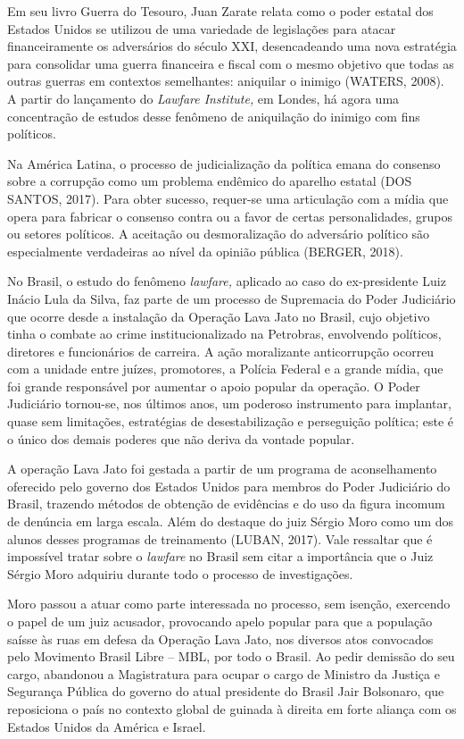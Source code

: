 Em seu livro Guerra do Tesouro, Juan Zarate relata como o poder estatal
dos Estados Unidos se utilizou de uma variedade de legislações para
atacar financeiramente os adversários do século XXI, desencadeando uma
nova estratégia para consolidar uma guerra financeira e fiscal com o
mesmo objetivo que todas as outras guerras em contextos semelhantes:
aniquilar o inimigo (WATERS, 2008). A partir do lançamento do
\emph{Lawfare Institute,} em Londes, há agora uma concentração de
estudos desse fenômeno de aniquilação do inimigo com fins políticos.

Na América Latina, o processo de judicialização da política emana do
consenso sobre a corrupção como um problema endêmico do aparelho estatal
(DOS SANTOS, 2017). Para obter sucesso, requer-se uma articulação com a
mídia que opera para fabricar o consenso contra ou a favor de certas
personalidades, grupos ou setores políticos. A aceitação ou
desmoralização do adversário político são especialmente verdadeiras ao
nível da opinião pública (BERGER, 2018).

No Brasil, o estudo do fenômeno \emph{lawfare,} aplicado ao caso do
ex-presidente Luiz Inácio Lula da Silva, faz parte de um processo de
Supremacia do Poder Judiciário que ocorre desde a instalação da Operação
Lava Jato no Brasil, cujo objetivo tinha o combate ao crime
institucionalizado na Petrobras, envolvendo políticos, diretores e
funcionários de carreira. A ação moralizante anticorrupção ocorreu com a
unidade entre juízes, promotores, a Polícia Federal e a grande mídia,
que foi grande responsável por aumentar o apoio popular da operação. O
Poder Judiciário tornou-se, nos últimos anos, um poderoso instrumento
para implantar, quase sem limitações, estratégias de desestabilização e
perseguição política; este é o único dos demais poderes que não deriva
da vontade popular.

A operação Lava Jato foi gestada a partir de um programa de
aconselhamento oferecido pelo governo dos Estados Unidos para membros do
Poder Judiciário do Brasil, trazendo métodos de obtenção de evidências e
do uso da figura incomum de denúncia em larga escala. Além do destaque
do juiz Sérgio Moro como um dos alunos desses programas de treinamento
(LUBAN, 2017). Vale ressaltar que é impossível tratar sobre o
\emph{lawfare} no Brasil sem citar a importância que o Juiz Sérgio Moro
adquiriu durante todo o processo de investigações.

Moro passou a atuar como parte interessada no processo, sem isenção,
exercendo o papel de um juiz acusador, provocando apelo popular para que
a população saísse às ruas em defesa da Operação Lava Jato, nos diversos
atos convocados pelo Movimento Brasil Libre -- MBL, por todo o Brasil.
Ao pedir demissão do seu cargo, abandonou a Magistratura para ocupar o
cargo de Ministro da Justiça e Segurança Pública do governo do atual
presidente do Brasil Jair Bolsonaro, que reposiciona o país no contexto
global de guinada à direita em forte aliança com os Estados Unidos da
América e Israel.

